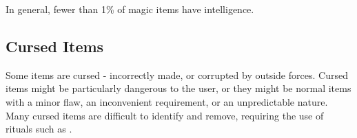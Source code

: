 In general, fewer than 1\% of magic items have intelligence.

\subsection{Cursed Items}

Some items are cursed - incorrectly made, or corrupted by outside forces.
Cursed items might be particularly dangerous to the user, or they might be normal items with a minor flaw, an inconvenient requirement, or an unpredictable nature.
Many cursed items are difficult to identify and remove, requiring the use of rituals such as .

